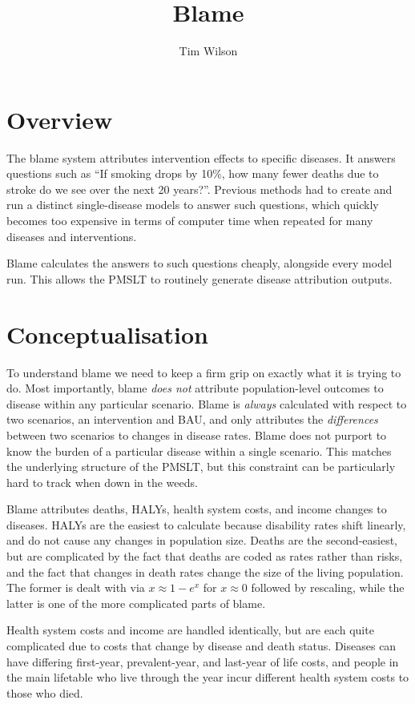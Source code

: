 \documentclass[]{article}
\title{Blame}
\author{Tim Wilson}
\begin{document}
	
\maketitle

\section{Overview}

The blame system attributes intervention effects to specific diseases. It answers questions such as ``If smoking drops by 10\%, how many fewer deaths due to stroke do we see over the next 20 years?''. Previous methods had to create and run a distinct single-disease models to answer such questions, which quickly becomes too expensive in terms of computer time when repeated for many diseases and interventions. 

Blame calculates the answers to such questions cheaply, alongside every model run. This allows the PMSLT to routinely generate disease attribution outputs.

\section{Conceptualisation}

To understand blame we need to keep a firm grip on exactly what it is trying to do. Most importantly, blame \textit{does not} attribute population-level outcomes to disease within any particular scenario. Blame is \textit{always} calculated with respect to two scenarios, an intervention and BAU, and only attributes the \textit{differences} between two scenarios to changes in disease rates. Blame does not purport to know the burden of a particular disease within a single scenario. This matches the underlying structure of the PMSLT, but this constraint can be particularly hard to track when down in the weeds.

Blame attributes deaths, HALYs, health system costs, and income changes to diseases. HALYs are the easiest to calculate because disability rates shift linearly, and do not cause any changes in population size. Deaths are the second-easiest, but are complicated by the fact that deaths are coded as rates rather than risks, and the fact that changes in death rates change the size of the living population. The former is dealt with via $x \approx 1 - e^x$ for $x \approx 0$ followed by rescaling, while the latter is one of the more complicated parts of blame.

Health system costs and income are handled identically, but are each quite complicated due to costs that change by disease and death status. Diseases can have differing first-year, prevalent-year, and last-year of life costs, and people in the main lifetable who live through the year incur different health system costs to those who died.
\end{document}
